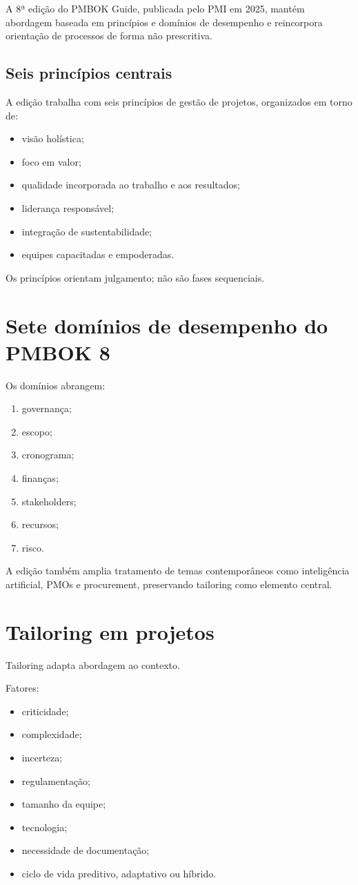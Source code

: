 A 8ª edição do PMBOK Guide, publicada pelo PMI em 2025, mantém abordagem baseada em princípios e domínios de desempenho e reincorpora orientação de processos de forma não prescritiva.

\subsection{Seis princípios centrais}

A edição trabalha com seis princípios de gestão de projetos, organizados em torno de:
\begin{itemize}
\item visão holística;
\item foco em valor;
\item qualidade incorporada ao trabalho e aos resultados;
\item liderança responsável;
\item integração de sustentabilidade;
\item equipes capacitadas e empoderadas.
\end{itemize}

Os princípios orientam julgamento; não são fases sequenciais.

\section{Sete domínios de desempenho do PMBOK 8}

Os domínios abrangem:
\begin{enumerate}
\item governança;
\item escopo;
\item cronograma;
\item finanças;
\item stakeholders;
\item recursos;
\item risco.
\end{enumerate}

A edição também amplia tratamento de temas contemporâneos como inteligência artificial, PMOs e procurement, preservando tailoring como elemento central.

\section{Tailoring em projetos}

Tailoring adapta abordagem ao contexto.

Fatores:
\begin{itemize}
\item criticidade;
\item complexidade;
\item incerteza;
\item regulamentação;
\item tamanho da equipe;
\item tecnologia;
\item necessidade de documentação;
\item ciclo de vida preditivo, adaptativo ou híbrido.
\end{itemize}

